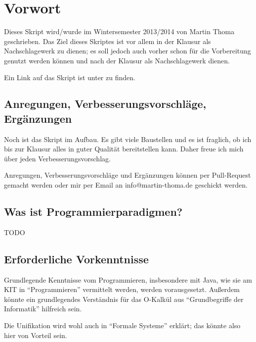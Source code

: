 \chapter*{Vorwort}
Dieses Skript wird/wurde im Wintersemester 2013/2014
von Martin Thoma geschrieben. Das Ziel dieses Skriptes ist vor allem
in der Klausur als Nachschlagewerk zu dienen; es soll jedoch auch
vorher schon für die Vorbereitung genutzt werden können und nach
der Klausur als Nachschlagewerk dienen.

Ein Link auf das Skript ist unter \href{http://martin-thoma.com/programmierparadigmen/}{}
zu finden.

\section*{Anregungen, Verbesserungsvorschläge, Ergänzungen}
Noch ist das Skript im Aufbau. Es gibt viele Baustellen und es ist
fraglich, ob ich bis zur Klausur alles in guter Qualität bereitstellen
kann. Daher freue ich mich über jeden Verbesserungsvorschlag.

Anregungen, Verbesserungsvorschläge und Ergänzungen können per
Pull-Request gemacht werden oder mir per Email an info@martin-thoma.de
geschickt werden.

\section*{Was ist Programmierparadigmen?}

TODO

\section*{Erforderliche Vorkenntnisse}
Grundlegende Kenntnisse vom Programmieren, insbesondere mit Java,
wie sie am KIT in \enquote{Programmieren} vermittelt werden, werden
vorausgesetzt. Außerdem könnte ein grundlegendes Verständnis für 
das O-Kalkül aus \enquote{Grundbegriffe der Informatik} hilfreich sein.

Die Unifikation wird wohl auch in \enquote{Formale Systeme}
erklärt; das könnte also hier von Vorteil sein.
